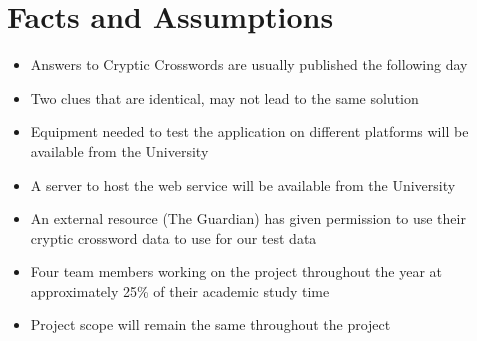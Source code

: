 \section{Facts and Assumptions}

\begin{itemize}
  \item Answers to Cryptic Crosswords are usually published the following day
  \item Two clues that are identical, may not lead to the same solution
  \item Equipment needed to test the application on different platforms will be
        available from the University
  \item A server to host the web service will be available from the University
  \item An external resource (The Guardian) has given permission to use their 
        cryptic crossword data to use for our test data
  \item Four team members working on the project throughout the year at 
        approximately 25\% of their academic study time
  \item Project scope will remain the same throughout the project
\end{itemize}